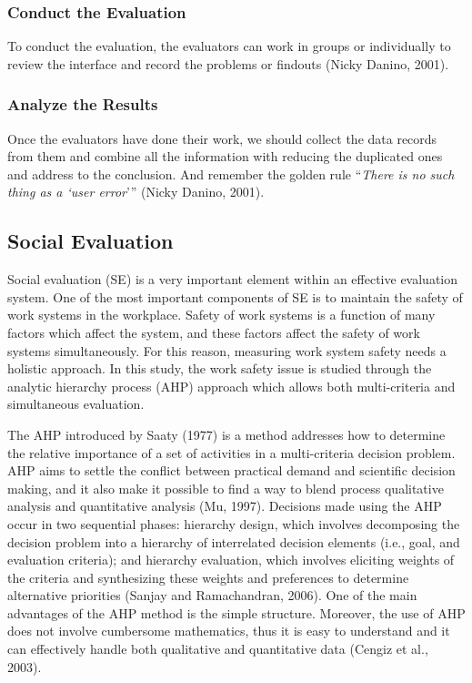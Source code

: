\documentclass[twocolumn]{article}
\begin{document}
\subsubsection{Conduct the Evaluation}
To conduct the evaluation, the evaluators can work in groups or individually to review the interface and record the problems or findouts (Nicky Danino, 2001).

\subsubsection{Analyze the Results}
Once the evaluators have done their work, we should collect the data records from them and combine all the information with reducing the duplicated ones and address to the conclusion. And remember the golden rule “\emph{There is no such thing as a ‘user error}’” (Nicky Danino, 2001).

%
%
%


\subsection{Social Evaluation}
Social evaluation (SE) is a very important element within an effective evaluation system. One of the most important components of SE is to maintain the safety of work systems in the workplace. Safety of work systems is a function of many factors which affect the system, and these factors affect the safety of work systems simultaneously. For this reason, measuring work system safety needs a holistic approach. In this study, the work safety issue is studied through the analytic hierarchy process (AHP) approach which allows both multi-criteria and simultaneous evaluation. 

The AHP introduced by Saaty (1977) is a method addresses how to determine the relative importance of a set of activities in a multi-criteria decision problem. AHP aims to settle the conflict between practical demand and scientific decision making, and it also make it possible to find a way to blend process qualitative analysis and quantitative analysis (Mu, 1997). Decisions made using the AHP occur in two sequential phases: hierarchy design, which involves decomposing the decision problem into a hierarchy of interrelated decision elements (i.e., goal, and evaluation criteria); and hierarchy evaluation, which involves eliciting weights of the criteria and synthesizing these weights and preferences to determine alternative priorities (Sanjay and Ramachandran, 2006). One of the main advantages of the AHP method is the simple structure. Moreover, the use of AHP does not involve cumbersome mathematics, thus it is easy to understand and it can effectively handle both qualitative and quantitative data (Cengiz et al., 2003).
\end{document}
